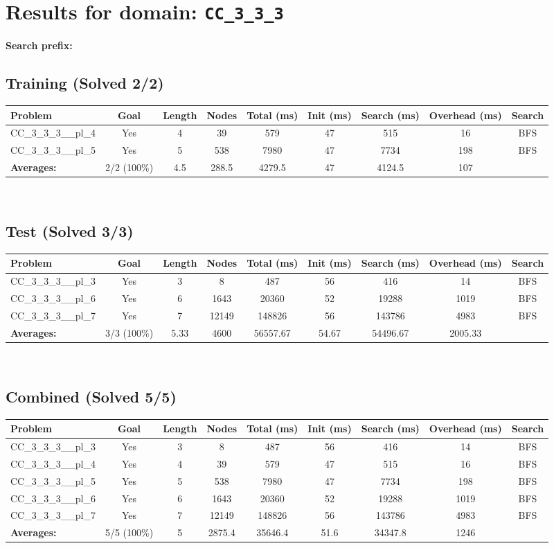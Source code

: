 \documentclass{article}
\begin{document}
\section*{Results for domain: \texttt{CC\_3\_3\_3}}
\textbf{Search prefix:} 
\\[0.5cm]
\subsection*{Training (Solved 2/2)}
\begin{tabular}{lcccccccc}
\toprule
Problem & Goal & Length & Nodes & Total (ms) & Init (ms) & Search (ms) & Overhead (ms) & Search \\
\midrule
CC\_3\_3\_3\_\_pl\_4 & Yes & 4 & 39 & 579 & 47 & 515 & 16 & BFS \\
CC\_3\_3\_3\_\_pl\_5 & Yes & 5 & 538 & 7980 & 47 & 7734 & 198 & BFS \\
\textbf{Averages:} & 2/2 (100\%) & 4.5 & 288.5 & 4279.5 & 47 & 4124.5 & 107 & \\
\bottomrule
\end{tabular}
\\[0.7cm]
\subsection*{Test (Solved 3/3)}
\begin{tabular}{lcccccccc}
\toprule
Problem & Goal & Length & Nodes & Total (ms) & Init (ms) & Search (ms) & Overhead (ms) & Search \\
\midrule
CC\_3\_3\_3\_\_pl\_3 & Yes & 3 & 8 & 487 & 56 & 416 & 14 & BFS \\
CC\_3\_3\_3\_\_pl\_6 & Yes & 6 & 1643 & 20360 & 52 & 19288 & 1019 & BFS \\
CC\_3\_3\_3\_\_pl\_7 & Yes & 7 & 12149 & 148826 & 56 & 143786 & 4983 & BFS \\
\textbf{Averages:} & 3/3 (100\%) & 5.33 & 4600 & 56557.67 & 54.67 & 54496.67 & 2005.33 & \\
\bottomrule
\end{tabular}
\\[0.7cm]
\subsection*{Combined (Solved 5/5)}
\begin{tabular}{lcccccccc}
\toprule
Problem & Goal & Length & Nodes & Total (ms) & Init (ms) & Search (ms) & Overhead (ms) & Search \\
\midrule
CC\_3\_3\_3\_\_pl\_3 & Yes & 3 & 8 & 487 & 56 & 416 & 14 & BFS \\
CC\_3\_3\_3\_\_pl\_4 & Yes & 4 & 39 & 579 & 47 & 515 & 16 & BFS \\
CC\_3\_3\_3\_\_pl\_5 & Yes & 5 & 538 & 7980 & 47 & 7734 & 198 & BFS \\
CC\_3\_3\_3\_\_pl\_6 & Yes & 6 & 1643 & 20360 & 52 & 19288 & 1019 & BFS \\
CC\_3\_3\_3\_\_pl\_7 & Yes & 7 & 12149 & 148826 & 56 & 143786 & 4983 & BFS \\
\textbf{Averages:} & 5/5 (100\%) & 5 & 2875.4 & 35646.4 & 51.6 & 34347.8 & 1246 & \\
\bottomrule
\end{tabular}
\\[0.7cm]
\end{document}
